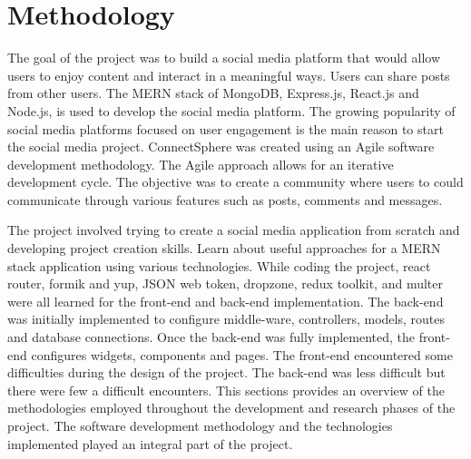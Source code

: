 \chapter{Methodology}
The goal of the project was to build a social media platform that would allow users to enjoy content and interact in a meaningful ways. Users can share posts from other users. The MERN stack of MongoDB, Express.js, React.js and Node.js, is used to develop the social media platform. The growing popularity of social media platforms focused on user engagement is the main reason to start the social media project. ConnectSphere was created using an Agile software development methodology. The Agile approach allows for an iterative development cycle. The objective was to create a community where users to could communicate through various features such as posts, comments and messages. 

The project involved trying to create a social media application from scratch and developing project creation skills. Learn about useful approaches for a MERN stack application using various technologies. While coding the project, react router, formik and yup, JSON web token, dropzone, redux toolkit, and multer were all learned for the front-end and back-end implementation. The back-end was initially implemented to configure middle-ware, controllers, models, routes and database connections. Once the back-end was fully implemented, the front-end configures widgets, components and pages. The front-end encountered some difficulties during the design of the project. The back-end was less difficult but there were few a difficult encounters. This sections provides an overview of the methodologies employed throughout the development and research phases of the project. The software development methodology and the technologies implemented played an integral part of the project.

